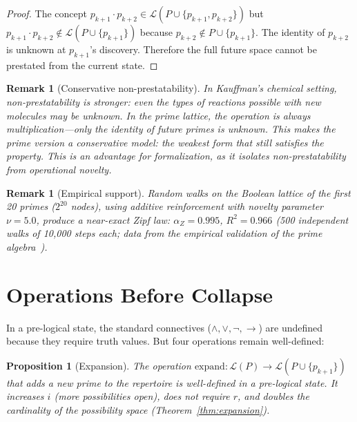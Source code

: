 \documentclass[11pt,a4paper]{article}
\newtheorem{proposition}[theorem]{Proposition}
\newtheorem{remark}[theorem]{Remark}
\begin{document}
\begin{proof}
The concept $p_{k+1} \cdot p_{k+2} \in \mathcal{L}(P \cup \{p_{k+1}, p_{k+2}\})$
but $p_{k+1} \cdot p_{k+2} \notin \mathcal{L}(P \cup \{p_{k+1}\})$
because $p_{k+2} \notin P \cup \{p_{k+1}\}$. The identity of $p_{k+2}$
is unknown at $p_{k+1}$'s discovery. Therefore the full future space
cannot be prestated from the current state.
\end{proof}

\begin{remark}[Conservative non-prestatability]
\label{rem:conservative}
In Kauffman's chemical setting, non-prestatability is stronger: even the
\emph{types of reactions} possible with new molecules may be unknown.
In the prime lattice, the operation is always multiplication---only the
identity of future primes is unknown. This makes the prime version a
conservative model: the weakest form that still satisfies the property.
This is an advantage for formalization, as it isolates non-prestatability
from operational novelty.
\end{remark}

\begin{remark}[Empirical support]
\label{rem:zipf}
Random walks on the Boolean lattice of the first 20 primes
($2^{20}$ nodes), using additive reinforcement with novelty
parameter~$\nu = 5.0$, produce a near-exact Zipf law:
$\alpha_Z = 0.995$, $R^2 = 0.966$ (500 independent walks of 10,000
steps each; data from the empirical validation of the prime
algebra~\citep{p4}).
\end{remark}

\section{Operations Before Collapse}
\label{sec:operations}

In a pre-logical state, the standard connectives ($\wedge, \vee, \neg,
\to$) are undefined because they require truth values. But four
operations remain well-defined:

\begin{proposition}[Expansion]
\label{prop:expansion-op}
The operation $\mathrm{expand}: \mathcal{L}(P) \to \mathcal{L}(P \cup \{p_{k+1}\})$
that adds a new prime to the repertoire is well-defined in a pre-logical
state. It increases $i$ (more possibilities open), does not require $r$,
and doubles the cardinality of the possibility space
(Theorem~\ref{thm:expansion}).
\end{proposition}
\end{document}
